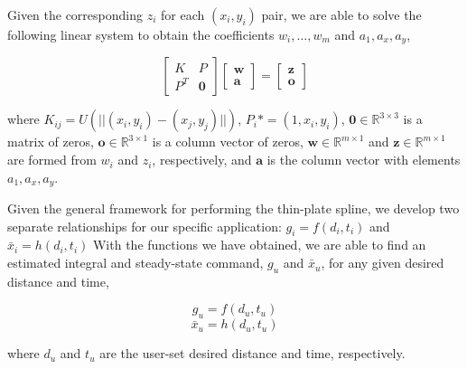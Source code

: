 \documentclass[letterpaper, 10 pt, conference]{ieeeconf}  %
\begin{document}
Given the corresponding $z_i$ for each $(x_i,y_i)$ pair, we are able to solve the following linear system to obtain the coefficients $w_i,\ldots,w_m$ and $a_1,a_x,a_y$,

\begin{equation}
    \begin{bmatrix}
    K&P\\
    P^T& \mathbf{0}
    \end{bmatrix}
    \begin{bmatrix}
    \mathbf{w}\\
    \mathbf{a}
    \end{bmatrix} = 
    \begin{bmatrix}
    \mathbf{z}\\
    \mathbf{o}
    \end{bmatrix}
\end{equation}

where $K_{ij} = U(||(x_i,y_i)-(x_j,y_j)||)$, $P_i* = (1,x_i,y_i)$, $\mathbf{0}  \in \mathbb{R}^{3\times3}$ is a matrix of zeros, $\mathbf{o} \in \mathbb{R}^{3\times1}$ is a column vector of zeros, $\mathbf{w} \in \mathbb{R}^{m\times1}$ and $\mathbf{z} \in \mathbb{R}^{m\times1}$ are formed from $w_i$ and $z_i$, respectively, and $\mathbf{a}$ is the column vector with elements $a_1,a_x,a_y$.

Given the general framework for performing the thin-plate spline, we develop two separate relationships for our specific application: $g_i = f(d_i,t_i)$ and $\bar{x}_i = h(d_i,t_i)$
With the functions we have obtained, we are able to find an estimated integral and steady-state command, $g_u$ and $\bar{x}_u$, for any given desired distance and time,

\begin{equation} \label{eq:integralfit}
g_u = f(d_u,t_u)
\end{equation}
\begin{equation} \label{eq:ssvelfit}
\bar{x}_u = h(d_u,t_u)
\end{equation}

where $d_u$ and $t_u$ are the user-set desired distance and time, respectively.
\end{document}

